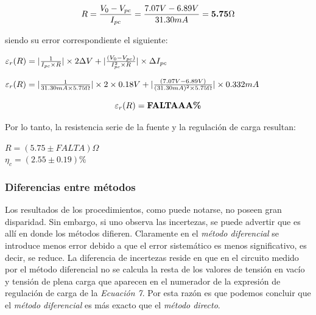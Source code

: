 \documentclass{article}
\begin{document}
\begin{equation}
	R = {V_{0} - V_{pc} \over I_{pc}} = {7.07V - 6.89V \over 31.30mA} = \textbf{5.75$\Omega$} \\
\end{equation}
\bigskip


\noindent siendo su error correspondiente el siguiente:
\bigskip


\begin{center}
	$\varepsilon_r(R) = |{1\over I_{pc} \times R}|\times 2\Delta V + |{(V_{0}-V_{pc})  \over  I_{pc}^2  \times R}| \times \Delta I_{pc} $ \\
\end{center}

\begin{center}
	$\varepsilon_r(R) = |{1\over 31.30mA \times 5.75\Omega}|\times 2\times 0.18V+ |{(7.07V-6.89V)  \over  (31.30mA)^2  \times 5.75\Omega}| \times 0.332mA$ \\
\end{center}

\begin{equation}
	\varepsilon_r(R) = \textbf{FALTAAA\%} \\
\end{equation}
\bigskip\bigskip


\noindent Por lo tanto, la resistencia serie de la fuente y la regulación de carga resultan:
\medskip

\begin{center}
	$R = (5.75 \pm FALTA)\Omega $ \\ \medskip
	$\eta_c = (2.55 \pm 0.19)\% $ 
\end{center}
\bigskip\bigskip





\subsubsection{Diferencias entre métodos}

	Los resultados de los procedimientos, como puede notarse, no poseen gran disparidad. Sin embargo, si uno observa las incertezas, se puede advertir que es allí en donde los métodos difieren. Claramente en el \textit{método diferencial} se introduce menos error debido a que el error sistemático es menos significativo, es decir, se reduce. La diferencia de incertezas reside en que en el circuito medido por el método diferencial no se calcula la resta de los valores de tensión en vacío y tensión de plena carga que aparecen en el numerador de la expresión de regulación de carga de la \textit{Ecuación 7}. Por esta razón es que podemos concluir que el \textit{método diferencial} es más exacto que el \textit{método directo}.
\bigskip\bigskip\bigskip
\end{document}
